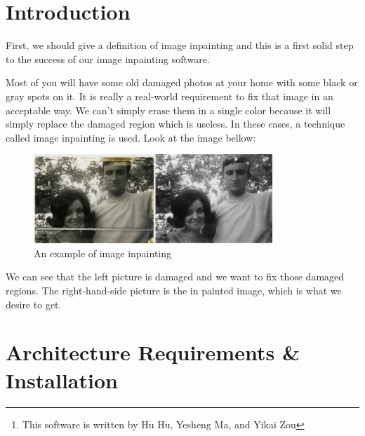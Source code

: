 \begin{abstract}
In this user guide, I will introduce how to use this image inpainting software\footnote{This software is written by Hu Hu, Yesheng Ma, and Yikai Zou} both with the exemplar-based mode and the Markov random field mode. And I will illustrate my ideas using abundant figures.
\end{abstract}
\newpage


\section{Introduction}
First, we should give a definition of image inpainting and this is a first solid step to the success of our image inpainting software.

Most of you will have some old damaged photos at your home with some black or gray spots on it. It is really a real-world requirement to fix that image in an acceptable way. We can't simply erase them in a single color because it will simply replace the damaged region which is useless. In these cases, a technique called image inpainting is used. Look at the image bellow:
\begin{figure}[H]
\centering
\includegraphics[width=9cm]{def.jpg}
\caption{An example of image inpainting}
\end{figure}
We can see that the left picture is damaged and
we want to fix those damaged regions. The right-hand-side picture is the in painted image, which is what we desire to get.
\newpage



\section{Architecture Requirements \& Installation}

